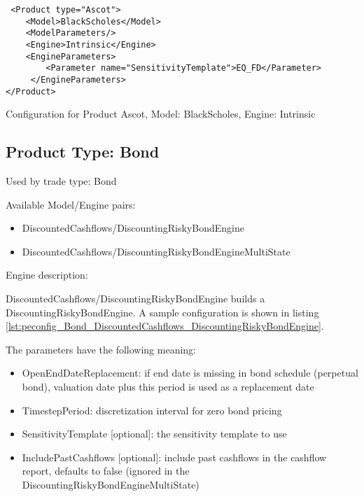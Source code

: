 \begin{longlisting}
\begin{verbatim}
 <Product type="Ascot">
    <Model>BlackScholes</Model>
    <ModelParameters/>
    <Engine>Intrinsic</Engine>
    <EngineParameters>
        <Parameter name="SensitivityTemplate">EQ_FD</Parameter>
     </EngineParameters>
</Product>
\end{verbatim}
\caption{Configuration for Product Ascot, Model: BlackScholes, Engine: Intrinsic}
\label{lst:peconfig_Ascot_BlackScholes_Intrinsic}
\end{longlisting}

\subsection{Product Type: Bond}

Used by trade type: Bond

Available Model/Engine pairs:

\begin{itemize}
\item DiscountedCashflows/DiscountingRiskyBondEngine
\item DiscountedCashflows/DiscountingRiskyBondEngineMultiState
\end{itemize}

Engine description:

DiscountedCashflows/DiscountingRiskyBondEngine builds a DiscountingRiskyBondEngine. A sample configuration is shown
in listing \ref{lst:peconfig_Bond_DiscountedCashflows_DiscountingRiskyBondEngine}.

The parameters have the following meaning:

\begin{itemize}
\item OpenEndDateReplacement: if end date is missing in bond schedule (perpetual bond), valuation date plus this period is used as a replacement date
\item TimestepPeriod: discretization interval for zero bond pricing
\item SensitivityTemplate [optional]: the sensitivity template to use 
\item IncludePastCashflows [optional]: include past cashflows in the cashflow report, defaults to false (ignored in the DiscountingRiskyBondEngineMultiState)
\end{itemize}

